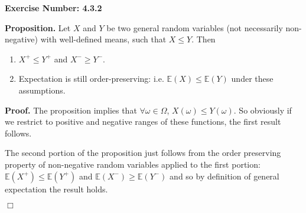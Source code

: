 \documentclass{article}
\begin{document}
\noindent \textbf{Exercise Number: 4.3.2}  %

\medskip 

\noindent \textbf{Proposition.} Let $X$ and $Y$ be two general random variables (not necessarily non-negative) with well-defined means, such that $X \leq Y$. Then 

\begin{enumerate}

\item $X^+ \leq Y^+$ and $X^- \geq Y^-$.

\item Expectation is still order-preserving: i.e. $\mathbb{E}(X) \leq \mathbb{E}(Y)$ under these assumptions. 

\end{enumerate}

\bigskip

\noindent \textbf{Proof.} The proposition implies that $\forall \omega \in \Omega$, $X(\omega) \leq Y(\omega)$. So obviously if we restrict to positive and negative ranges of these functions, the first result follows. 

The second portion of the proposition just follows from the order preserving property of non-negative random variables applied to the first portion: $\mathbb{E}(X^+) \leq \mathbb{E}(Y^+)$ and $\mathbb{E}(X^-) \geq \mathbb{E}(Y^-)$ and so by definition of general expectation the result holds. 

\hfill $\Box$
\end{document}
